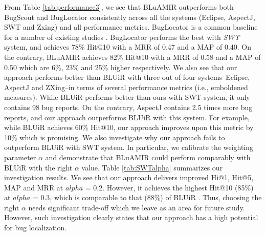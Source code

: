 \documentclass[sigconf,review,anonymous]{acmart}
\begin{document}
From Table \ref{tab:performance3}, we see that BLuAMIR outperforms both BugScout and BugLocator consistently across all the systems (Eclipse, AspectJ, SWT and Zxing) and all performance metrics.
BugLocator is a common baseline for a number of existing studies \cite{Saha,Wang2,Wang}. BugLocator performs the best with \emph{SWT} system, and achieves 78\% Hit@10 with a MRR of 0.47 and a MAP of 0.40. On the contrary, BLuAMIR achieves 82\% Hit@10 with a MRR of 0.58 and a MAP of 0.50 which are 6\%, 23\% and 25\% higher respectively. We also see that our approach performs better than BLUiR with three out of four systems--Eclipse, AspectJ and ZXing--in terms of several performance metrics (i.e., emboldened measures). While BLUiR performs better than ours with SWT system, it only contains 98 bug reports. On the contrary, AspectJ contains 2.5 times more bug reports, and our approach outperforms BLUiR with this system. For example, while BLUiR achieves 60\% Hit@10, our approach improves upon this metric by 10\% which is promising.      
We also investigate why our approach fails to outperform BLUiR with SWT system. In particular, we calibrate the weighting parameter $\alpha$ and demonstrate that BLuAMIR could perform comparably with BLUiR with the right $\alpha$ value. Table \ref{tab:SWTalpha} summarizes our investigation results. We see that our approach delivers improved Hi@1, Hit@5, MAP and MRR at $alpha$ = $0.2$. However, it achieves the highest Hit@10 (85\%) at $alpha$ = $0.3$, which is comparable to that (88\%) of BLUiR \cite{Saha}. Thus, choosing the right $\alpha$ needs significant trade-off which we leave as an area for future study. However, such investigation clearly states that our approach has a high potential for bug localization. 
\end{document}
